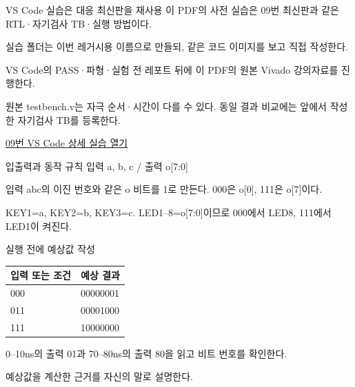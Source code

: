 \begin{frame}{VS Code 실습은 대응 최신판을 재사용}\relax
\small
이 PDF의 사전 실습은 09번 최신판과 같은 RTL·자기검사 TB·실행 방법이다.\par\vspace{0.22cm}실습 폴더는 이번 레거시용 이름으로 만들되, 같은 코드 이미지를 보고 직접 작성한다.\par\vspace{0.22cm}VS Code의 PASS·파형·실험 전 레포트 뒤에 이 PDF의 원본 Vivado 강의자료를 진행한다.\par\vspace{0.22cm}원본 testbench.v는 자극 순서·시간이 다를 수 있다. 동일 결과 비교에는 앞에서 작성한 자기검사 TB를 등록한다.\par\href{04.LAB1_09_DECODER3TO8_VIVADO.pdf}{09번 VS Code 상세 실습 열기}
\end{frame}

\begin{frame}[label=legacy-09-sim]{입출력과 동작 규칙}\relax
\small
입력 a, b, c / 출력 o[7:0]\par\vspace{0.22cm}입력 abc의 이진 번호와 같은 o 비트를 1로 만든다. 000은 o[0], 111은 o[7]이다.\par\vspace{0.22cm}KEY1=a, KEY2=b, KEY3=c. LED1–8=o[7:0]이므로 000에서 LED8, 111에서 LED1이 켜진다.\par
\end{frame}

\begin{frame}{실행 전에 예상값 작성}\relax
\small
\begin{center}\renewcommand{\arraystretch}{1.45}
\begin{tabular}{l|l}
입력 또는 조건 & 예상 결과\\\hline
000 & 00000001\\
011 & 00001000\\
111 & 10000000\\
\end{tabular}\end{center}
0–10ns의 출력 01과 70–80ns의 출력 80을 읽고 비트 번호를 확인한다.\par\vspace{0.22cm}예상값을 계산한 근거를 자신의 말로 설명한다.\par
\end{frame}

